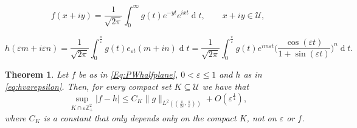 \documentclass[10pt,a4paper]{amsart}
\newtheorem{thm}{Theorem}
\begin{document}
    \begin{equation}\label{Eq:PWhalfplane}
    f(x+iy)=\frac{1}{\sqrt{2\pi}} \int_0^\infty g(t) e^{-yt} e^{ixt}\operatorname{d}\! t, \qquad x+iy\in\mathcal{U},
    \end{equation}

    \begin{equation}\label{eq:hvarepsilon}
    h(\varepsilon m+i\varepsilon n)=\frac{1}{\sqrt{2\pi}}\int_0^{\frac\pi\varepsilon}g(t)e_{\varepsilon t}(m+in)\operatorname{d}\!t= \frac{1}{\sqrt{2\pi}}\int_0^{\frac\pi\varepsilon} g(t) e^{im\varepsilon t}\Big(\frac{\cos(\varepsilon t)}{1+\sin(\varepsilon t)}\Big)^{n} \operatorname{d}\!t.
    \end{equation}

    \begin{thm}\label{T:approximationdiscrete}
    Let $f$ be as in \eqref{Eq:PWhalfplane}, $0<\varepsilon\leqslant1$ and $h$ as in \eqref{eq:hvarepsilon}. Then, for every compact set $K\subseteq \mathcal U$ we have that
    \[
    \sup_{K\cap\varepsilon\mathbb{Z}^2_+}|f-h|
    \leqslant C_K \|g\|_{L^2((\frac{\pi}{2\varepsilon},\frac{\pi}{\varepsilon}))}+O(\varepsilon^{\frac{1}{4}}),
    \]
    where $C_K$ is a constant that only depends only on the compact $K$, not on $\varepsilon$ or $f$.
    \end{thm}
\end{document}
